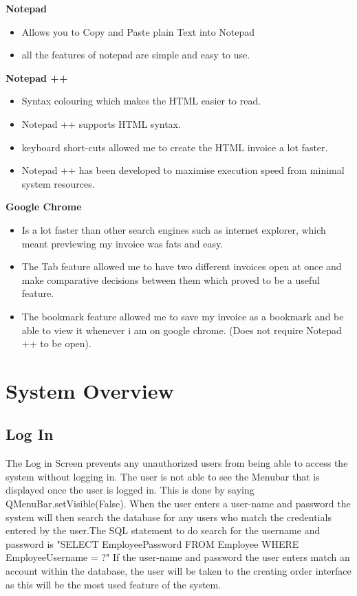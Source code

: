 \textbf{Notepad}
\begin{itemize}
	\item Allows you to Copy and Paste plain Text into Notepad
	\item all the features of notepad are simple and easy to use.
\end{itemize}
\vspace{5mm}

\textbf{Notepad ++}
\begin{itemize}
	\item Syntax colouring which makes the HTML easier to read.
	\item Notepad ++ supports HTML syntax.
	\item keyboard short-cuts allowed me to create the HTML invoice a lot faster.
	\item Notepad ++ has been developed to maximise execution speed from minimal system resources.
\end{itemize}
\vspace{5mm}

\textbf{Google Chrome}
\begin{itemize}
	\item Is a lot faster than other search engines such as internet explorer, which meant previewing my invoice was fats and easy.
	\item The Tab feature allowed me to have two different invoices open at once and make comparative decisions between them which proved to be a useful feature.
	\item The bookmark feature allowed me to save my invoice as a bookmark and be able to view it whenever i am on google chrome. (Does not require Notepad ++ to be open).
\end{itemize}

\pagebreak

\section{System Overview}

\subsection{Log In}

The Log in Screen prevents any unauthorized users from being able to access the system without logging in. The user is not able to see the Menubar that is displayed once the user is logged in. This is done by saying QMenuBar.setVisible(False). When the user enters a user-name and password the system will then search the database for any users who match the credentials entered by the user.The SQL statement to do search for the username and password is "SELECT EmployeePassword FROM Employee WHERE EmployeeUsername = ?" If the user-name and password the user enters match an account within the database, the user will be taken to the creating order interface as this will be the most used feature of the system.\par

